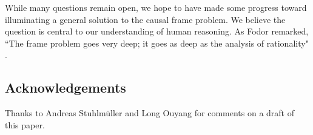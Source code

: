 \documentclass[10pt,letterpaper]{article}
\begin{document}
%
%
%

While many questions remain open, we hope to have made some progress toward illuminating a general solution to the causal frame problem. 
We believe the question is central to our understanding of human reasoning. As Fodor remarked, ``The frame problem goes very deep; it goes as deep as the analysis of rationality" \citep{Fodor1987}.


\subsection{Acknowledgements} Thanks to Andreas Stuhlm\"{u}ller and Long Ouyang for comments on a draft of this paper.




\end{document}
